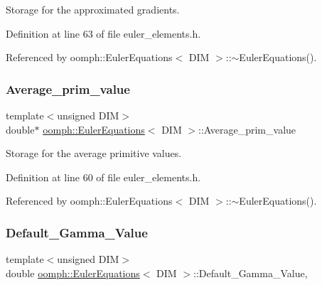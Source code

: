Storage for the approximated gradients. 



Definition at line 63 of file euler\+\_\+elements.\+h.



Referenced by oomph\+::\+Euler\+Equations$<$ D\+I\+M $>$\+::$\sim$\+Euler\+Equations().

\mbox{\label{classoomph_1_1EulerEquations_a2a0682d90bb2ae74a2e6cb1ef0e106db}} 
\subsubsection{\texorpdfstring{Average\+\_\+prim\+\_\+value}{Average\_prim\_value}}
{\footnotesize\ttfamily template$<$unsigned D\+IM$>$ \\
double$\ast$ \hyperlink{classoomph_1_1EulerEquations}{oomph\+::\+Euler\+Equations}$<$ D\+IM $>$\+::Average\+\_\+prim\+\_\+value\hspace{0.3cm}{\ttfamily [private]}}



Storage for the average primitive values. 



Definition at line 60 of file euler\+\_\+elements.\+h.



Referenced by oomph\+::\+Euler\+Equations$<$ D\+I\+M $>$\+::$\sim$\+Euler\+Equations().

\mbox{\label{classoomph_1_1EulerEquations_ae5afff2a26816dd230386b3c1b15d7dd}} 
\subsubsection{\texorpdfstring{Default\+\_\+\+Gamma\+\_\+\+Value}{Default\_Gamma\_Value}}
{\footnotesize\ttfamily template$<$unsigned D\+IM$>$ \\
double \hyperlink{classoomph_1_1EulerEquations}{oomph\+::\+Euler\+Equations}$<$ D\+IM $>$\+::Default\+\_\+\+Gamma\+\_\+\+Value\hspace{0.3cm}{\ttfamily [static]}, {\ttfamily [private]}}



